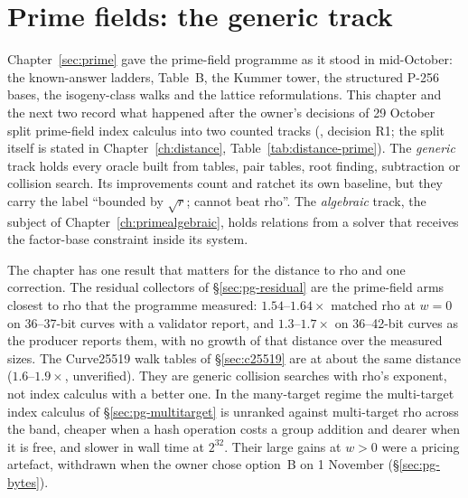 
\chapter{Prime fields: the generic track}\label{ch:primegeneric}

Chapter~\ref{sec:prime} gave the prime-field programme as it stood in
mid-October: the known-answer ladders, Table~B, the Kummer tower, the
structured P-256 bases, the isogeny-class walks and the lattice
reformulations. This chapter and the next two record what happened after
the owner's decisions of 29 October split prime-field index calculus into
two counted tracks (,
decision R1; the split itself is stated in Chapter~\ref{ch:distance},
Table~\ref{tab:distance-prime}). The \emph{generic} track holds every
oracle built from tables, pair tables, root finding, subtraction or
collision search. Its improvements count and ratchet its own baseline, but
they carry the label ``bounded by $\sqrt r$; cannot beat rho''. The
\emph{algebraic} track, the subject of Chapter~\ref{ch:primealgebraic},
holds relations from a solver that receives the factor-base constraint
inside its system.

The chapter has one result that matters for the distance to rho and one
correction. The residual collectors of \S\ref{sec:pg-residual} are the
prime-field arms closest to rho that the programme measured: $1.54$--$1.64\times$
matched rho at $w=0$ on 36--37-bit curves with a validator report, and
$1.3$--$1.7\times$ on 36--42-bit curves as the producer reports them, with no
growth of that distance over the measured sizes. The Curve25519 walk tables
of \S\ref{sec:c25519} are at about the same distance ($1.6$--$1.9\times$,
unverified). They are generic collision searches with rho's
exponent, not index calculus with a better one. In the many-target regime the
multi-target index calculus of \S\ref{sec:pg-multitarget} is unranked
against multi-target rho across the band, cheaper when a hash operation
costs a group addition and dearer when it is free, and slower in wall time
at $2^{32}$. Their large gains at
$w>0$ were a pricing artefact, withdrawn when the owner chose option~B on
1 November (\S\ref{sec:pg-bytes}).


